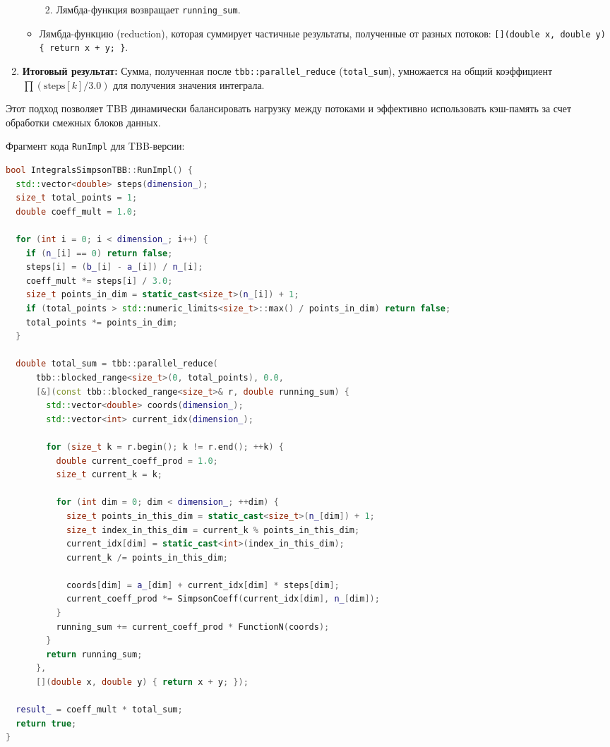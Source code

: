 \documentclass[a4paper,12pt]{article}
\begin{document}
\begin{enumerate}
\begin{itemize}
\begin{enumerate}
\begin{itemize}
                        \end{itemize}
                    \item Лямбда-функция возвращает \texttt{running\_sum}.
                \end{enumerate}
            \item Лямбда-функцию (reduction), которая суммирует частичные результаты, полученные от разных потоков: \texttt{[](double x, double y) \{ return x + y; \}}.
        \end{itemize}
    \item \textbf{Итоговый результат:} Сумма, полученная после \texttt{tbb::parallel\_reduce} (\texttt{total\_sum}), умножается на общий коэффициент $\prod (\text{steps}[k]/3.0)$ для получения значения интеграла.
\end{enumerate}
Этот подход позволяет TBB динамически балансировать нагрузку между потоками и эффективно использовать кэш-память за счет обработки смежных блоков данных.

Фрагмент кода \texttt{RunImpl} для TBB-версии:
\begin{lstlisting}[language=C++, caption=Фрагмент RunImpl для TBB-реализации (ops\_tbb.cpp), basicstyle=\ttfamily\scriptsize]
bool IntegralsSimpsonTBB::RunImpl() {
  std::vector<double> steps(dimension_);
  size_t total_points = 1;
  double coeff_mult = 1.0;

  for (int i = 0; i < dimension_; i++) {
    if (n_[i] == 0) return false;
    steps[i] = (b_[i] - a_[i]) / n_[i];
    coeff_mult *= steps[i] / 3.0;
    size_t points_in_dim = static_cast<size_t>(n_[i]) + 1;
    if (total_points > std::numeric_limits<size_t>::max() / points_in_dim) return false;
    total_points *= points_in_dim;
  }

  double total_sum = tbb::parallel_reduce(
      tbb::blocked_range<size_t>(0, total_points), 0.0,
      [&](const tbb::blocked_range<size_t>& r, double running_sum) {
        std::vector<double> coords(dimension_);
        std::vector<int> current_idx(dimension_);

        for (size_t k = r.begin(); k != r.end(); ++k) {
          double current_coeff_prod = 1.0;
          size_t current_k = k;

          for (int dim = 0; dim < dimension_; ++dim) {
            size_t points_in_this_dim = static_cast<size_t>(n_[dim]) + 1;
            size_t index_in_this_dim = current_k % points_in_this_dim;
            current_idx[dim] = static_cast<int>(index_in_this_dim);
            current_k /= points_in_this_dim;

            coords[dim] = a_[dim] + current_idx[dim] * steps[dim];
            current_coeff_prod *= SimpsonCoeff(current_idx[dim], n_[dim]);
          }
          running_sum += current_coeff_prod * FunctionN(coords);
        }
        return running_sum;
      },
      [](double x, double y) { return x + y; });

  result_ = coeff_mult * total_sum;
  return true;
}
\end{lstlisting}
\end{document}
